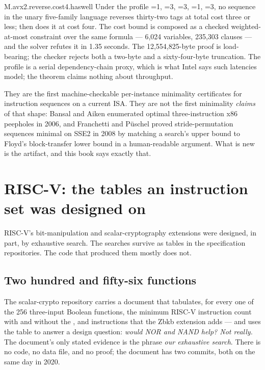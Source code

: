 \begin{artifact}{M.avx2.reverse.cost4.haswell}
Under the profile =1, =3, =3, =1, =3, no sequence in the unary five-family language reverses thirty-two tags at total cost three or less;  then  does it at cost four. The cost bound is composed as a checked weighted-at-most constraint over the same formula --- 6,024 variables, 235,303 clauses --- and the solver refutes it in 1.35 seconds. The 12,554,825-byte proof is load-bearing; the checker rejects both a two-byte and a sixty-four-byte truncation. The profile is a serial dependency-chain proxy, which is what Intel says such latencies model; the theorem claims nothing about throughput.
\end{artifact}

\begin{keyidea}[title={What these three theorems are, and are not}]
They are the first machine-checkable per-instance minimality certificates for instruction sequences on a current ISA. They are not the first minimality \emph{claims} of that shape: Bansal and Aiken enumerated optimal three-instruction x86 peepholes in 2006, and Franchetti and Püschel proved stride-permutation sequences minimal on SSE2 in 2008 by matching a search's upper bound to Floyd's block-transfer lower bound in a human-readable argument. What is new is the artifact, and this book says exactly that.
\end{keyidea}

\section{RISC-V: the tables an instruction set was designed on}
\label{sec:riscv}

RISC-V's bit-manipulation and scalar-cryptography extensions were designed, in part, by exhaustive search. The searches survive as tables in the specification repositories. The code that produced them mostly does not.

\subsection{Two hundred and fifty-six functions}

The scalar-crypto repository carries a document that tabulates, for every one of the 256 three-input Boolean functions, the minimum RISC-V instruction count with and without the ,  and  instructions that the Zbkb extension adds --- and uses the table to answer a design question: \emph{would NOR and NAND help? Not really.} The document's only stated evidence is the phrase \emph{our exhaustive search}. There is no code, no data file, and no proof; the document has two commits, both on the same day in 2020.

